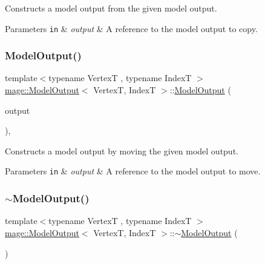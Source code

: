 Constructs a model output from the given model output.


\begin{DoxyParams}[1]{Parameters}
\mbox{\tt in}  & {\em output} & A reference to the model output to copy. \\
\hline
\end{DoxyParams}
\hypertarget{structmage_1_1_model_output_af0e7804a3b375b18fc7bfba1c6ee84bf}{}\label{structmage_1_1_model_output_af0e7804a3b375b18fc7bfba1c6ee84bf} 
\subsubsection{\texorpdfstring{Model\+Output()}{ModelOutput()}\hspace{0.1cm}{\footnotesize\ttfamily [3/3]}}
{\footnotesize\ttfamily template$<$typename VertexT , typename IndexT $>$ \\
\hyperlink{structmage_1_1_model_output}{mage\+::\+Model\+Output}$<$ VertexT, IndexT $>$\+::\hyperlink{structmage_1_1_model_output}{Model\+Output} (\begin{DoxyParamCaption}\item[{\hyperlink{structmage_1_1_model_output}{Model\+Output}$<$ VertexT, IndexT $>$ \&\&}]{output }\end{DoxyParamCaption})\hspace{0.3cm}{\ttfamily [default]}, {\ttfamily [noexcept]}}

Constructs a model output by moving the given model output.


\begin{DoxyParams}[1]{Parameters}
\mbox{\tt in}  & {\em output} & A reference to the model output to move. \\
\hline
\end{DoxyParams}
\hypertarget{structmage_1_1_model_output_a547ab5a433adfb253fab3431ad4c0dce}{}\label{structmage_1_1_model_output_a547ab5a433adfb253fab3431ad4c0dce} 
\subsubsection{\texorpdfstring{$\sim$\+Model\+Output()}{~ModelOutput()}}
{\footnotesize\ttfamily template$<$typename VertexT , typename IndexT $>$ \\
\hyperlink{structmage_1_1_model_output}{mage\+::\+Model\+Output}$<$ VertexT, IndexT $>$\+::$\sim$\hyperlink{structmage_1_1_model_output}{Model\+Output} (\begin{DoxyParamCaption}{ }\end{DoxyParamCaption})\hspace{0.3cm}{\ttfamily [default]}}

